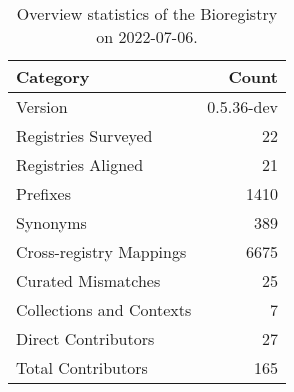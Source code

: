 \begin{table}
\centering
\caption{Overview statistics of the Bioregistry on 2022-07-06.}
\label{tab:bioregistry-summary}
\begin{tabular}{lr}
\toprule
                Category &      Count \\
\midrule
                 Version & 0.5.36-dev \\
     Registries Surveyed &         22 \\
      Registries Aligned &         21 \\
                Prefixes &       1410 \\
                Synonyms &        389 \\
 Cross-registry Mappings &       6675 \\
      Curated Mismatches &         25 \\
Collections and Contexts &          7 \\
     Direct Contributors &         27 \\
      Total Contributors &        165 \\
\bottomrule
\end{tabular}
\end{table}
